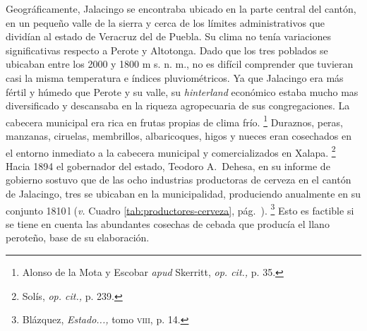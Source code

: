 \documentclass[14pt,twoside,final]{extbook} %
\let\oldfootnote\footnote
\renewcommand\footnote[1]{%
\oldfootnote{\hspace{1mm}#1}}
\begin{document}
Geográficamente, Jalacingo se encontraba ubicado en la parte central del cantón, en un pequeño valle de la sierra y cerca de los límites administrativos que dividían al estado de Veracruz del de Puebla. Su clima no tenía variaciones significativas respecto a Perote y Altotonga. Dado que los tres poblados se ubicaban entre los 2000 y 1800 m s. n. m., no es difícil comprender que tuvieran casi la misma temperatura e índices pluviométricos. Ya que Jalacingo era más fértil y húmedo que Perote y su valle, su \emph{hinterland} económico estaba mucho mas diversificado y descansaba en la riqueza agropecuaria de sus congregaciones. La cabecera municipal era rica en frutas propias de clima frío.\footnote{Alonso de la Mota y Escobar \emph{apud} Skerritt, \emph{op. cit.,} p. 35.} Duraznos, peras, manzanas, ciruelas, membrillos, albaricoques, higos y nueces eran cosechados en el entorno inmediato a la cabecera municipal y comercializados en Xalapa.\footnote{Solís, \emph{op. cit.,} p. 239.} Hacia 1894 el gobernador del estado, Teodoro A.~Dehesa, en su informe de gobierno sostuvo que de las ocho industrias productoras de cerveza en el cantón de Jalacingo, tres se ubicaban en la municipalidad, produciendo anualmente en su conjunto 1810\,l (\emph{v.} Cuadro \ref{tab:productores-cerveza}, pág.~\pageref{tab:productores-cerveza}).\footnote{Blázquez, \emph{Estado...,} tomo \textsc{viii}, p. 14.} Esto es factible si se tiene en cuenta las abundantes cosechas de cebada que producía el llano peroteño, base de su elaboración.\protect\enlargethispage*{\baselineskip}
\end{document}
